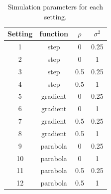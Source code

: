 \documentclass[authoryear, review, 11pt]{elsarticle}
\begin{document}

	
\begin{table}[h!]
	\begin{center}
	\begin{tabular}{cccc}
		\hline
		Setting & function & $\rho$ & $\sigma^2$ \\ 
		\hline
		1 & step & 0 & 0.25 \\ 
		2 & step & 0 & 1 \\ 
		3 & step & 0.5 & 0.25 \\ 
		4 & step & 0.5 & 1 \\ 
		\hline
		5 & gradient & 0 & 0.25 \\ 
		6 & gradient & 0 & 1 \\ 
		7 & gradient & 0.5 & 0.25 \\ 
		8 & gradient & 0.5 & 1 \\ 
		\hline
		9 & parabola & 0 & 0.25 \\ 
		10 & parabola & 0 & 1 \\ 
		11 & parabola & 0.5 & 0.25 \\ 
		12 & parabola & 0.5 & 1 
	\end{tabular}
	\end{center}
	\caption{Simulation parameters for each setting.\label{table:simulation_settings}}
\end{table}
\end{document}
